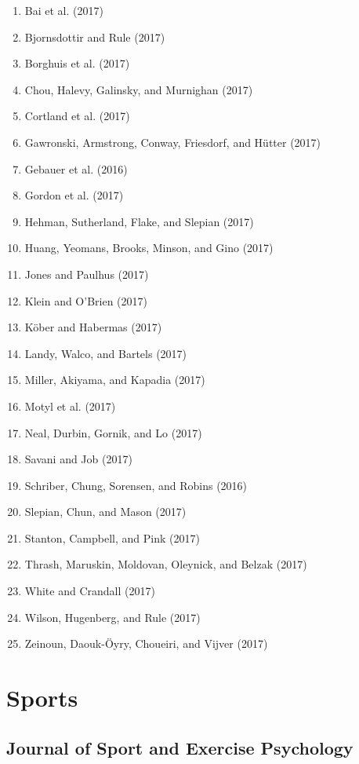 \documentclass[english,man]{apa6}
\providecommand{\tightlist}{%
  \setlength{\itemsep}{0pt}\setlength{\parskip}{0pt}}
\begin{document}
\begin{enumerate}
\def\labelenumi{\arabic{enumi})}
\tightlist
\item
  Bai et al. (2017)
\item
  Bjornsdottir and Rule (2017)
\item
  Borghuis et al. (2017)
\item
  Chou, Halevy, Galinsky, and Murnighan (2017)
\item
  Cortland et al. (2017)
\item
  Gawronski, Armstrong, Conway, Friesdorf, and Hütter (2017)
\item
  Gebauer et al. (2016)
\item
  Gordon et al. (2017)
\item
  Hehman, Sutherland, Flake, and Slepian (2017)
\item
  Huang, Yeomans, Brooks, Minson, and Gino (2017)
\item
  Jones and Paulhus (2017)
\item
  Klein and O'Brien (2017)
\item
  Köber and Habermas (2017)
\item
  Landy, Walco, and Bartels (2017)
\item
  Miller, Akiyama, and Kapadia (2017)
\item
  Motyl et al. (2017)
\item
  Neal, Durbin, Gornik, and Lo (2017)
\item
  Savani and Job (2017)
\item
  Schriber, Chung, Sorensen, and Robins (2016)
\item
  Slepian, Chun, and Mason (2017)
\item
  Stanton, Campbell, and Pink (2017)
\item
  Thrash, Maruskin, Moldovan, Oleynick, and Belzak (2017)
\item
  White and Crandall (2017)
\item
  Wilson, Hugenberg, and Rule (2017)
\item
  Zeinoun, Daouk-Öyry, Choueiri, and Vijver (2017)
\end{enumerate}

\section{Sports}\label{sports}

\subsection{Journal of Sport and Exercise
Psychology}\label{journal-of-sport-and-exercise-psychology}
\end{document}
